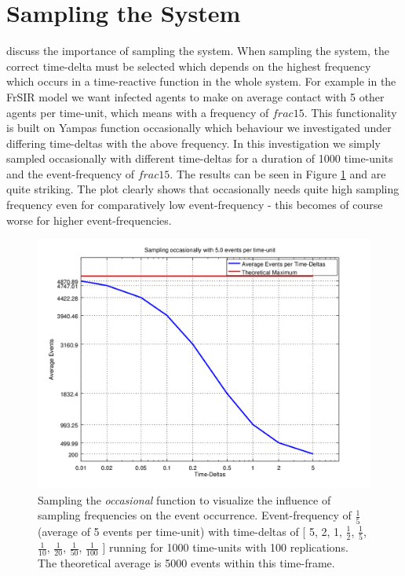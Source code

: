 \section{Sampling the System}
discuss the importance of sampling the system. When sampling the system, the correct time-delta must be selected which depends on the highest frequency which occurs in a time-reactive function in the whole system. For example in the FrSIR model we want infected agents to make on average contact with 5 other agents per time-unit, which means with a frequency of $frac{1}{5}$. This functionality is built on Yampas function occasionally which behaviour we investigated under differing time-deltas with the above frequency. In this investigation we simply sampled occasionally with different time-deltas for a duration of 1000 time-units and the event-frequency of $frac{1}{5}$. The results can be seen in Figure \ref{fig:sampling_occasionally_5evts} and are quite striking. The plot clearly shows that occasionally needs quite high sampling frequency even for comparatively low event-frequency - this becomes of course worse for higher event-frequencies.

\begin{figure}
	\centering
	\includegraphics[width=.6\textwidth, angle=0]{./../shared/fig/samplingTest_occasionally_5evts.png}
	\caption{Sampling the \textit{occasional} function to visualize the influence of sampling frequencies on the event occurrence. Event-frequency of $\frac{1}{5}$ (average of 5 events per time-unit) with time-deltas of [ 5, 2, 1, $\frac{1}{2}$, $\frac{1}{5}$, $\frac{1}{10}$, $\frac{1}{20}$, $\frac{1}{50}$, $\frac{1}{100}$ ] running for 1000 time-units with 100 replications. The theoretical average is 5000 events within this time-frame.}
	\label{fig:sampling_occasionally_5evts}
\end{figure}

